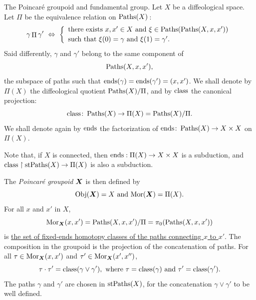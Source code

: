 \begin{Article}{The Poincar\'e groupoid and fundamental group.}{}
  \label{The-Poincare-groupoid-and-fundamental-group}
  Let $X$ be a diffeological space.
  Let $\Pi$ be the equivalence relation on $\operatorname{Paths}(X)$\,:
  $$%
    \gamma \mathop{\Pi} \gamma' \ \Leftrightarrow \
    \left\{\begin{array}{l}
      \mbox{there exists } x,x' \in X \mbox{ and } \xi \in \Paths(\Paths(X,x,x')) \\
      \vspace{-10pt} \\
      \mbox{such that } \xi(0) = \gamma \mbox{ and } \xi(1) = \gamma'.
    \end{array}
    \right.
  $$%
  Said differently,
  $\gamma$ and $\gamma'$ belong to the same component of
  $$%
  \Paths(X,x,x'),
  $$%
  the subspace of paths such that $\operatorname{ends}(\gamma) = \operatorname{ends}(\gamma') = (x,x')$.
  We shall denote by $\Pi(X)$ the
  diffeological quotient $\operatorname{Paths}(X)/\Pi$,
  and by $\operatorname{class}$ the canonical projection:
  $$%
  \Class \colon \Paths(X) \to \Pi(X) = \Paths(X)/\Pi.
  $$%
  We shall denote again by $\operatorname{ends}$ the factorization of $\operatorname{ends} \colon \operatorname{Paths}(X) \to X \times X$ on $\Pi(X)$.

  Note that, if $X$ is connected, then $\operatorname{ends} : \Pi(X) \to X \times X$ is a subduction,
  and $\operatorname{class} \restriction \operatorname{stPaths}(X) \to \Pi(X)$ is also a subduction.

  The \emph{Poincar{\'e} groupoid} $\boldsymbol{X}$ is then defined by
  $$%
  \Obj(\Poinc{X}) = X
  \SpacedText{and}
  \Mor(\Poinc{X}) = \Pi(X).
  $$%
  For all $x$ and $x'$ in $X$,
  $$%
  \Mor_{\Poinc{X}}(x,x') = \Paths(X,x,x')/\Pi = \pi_0(\Paths(X,x,x'))
  $$%
  is \uline{the set of fixed-ends homotopy classes of the paths connecting $x$ to $x'$}.
  The composition in the groupoid is the projection of the concatenation of paths.
  For all $\tau \in {\operatorname{Mor}}_{\boldsymbol{X}}(x,x')$ and $\tau' \in {\operatorname{Mor}}_{\boldsymbol{X}}(x',x'')$,
  $$%
  \tau \cdot \tau' = \Class(\gamma \vee \gamma'),
  \SpacedText{where}
  \tau = \Class(\gamma)
  \SpacedText{and}
  \tau' = \Class(\gamma').
  $$%
  The paths $\gamma$ and $\gamma'$ are chosen in $\operatorname{stPaths}(X)$, for the
  concatenation $\gamma \vee \gamma'$ to be well defined.


\end{Article}
